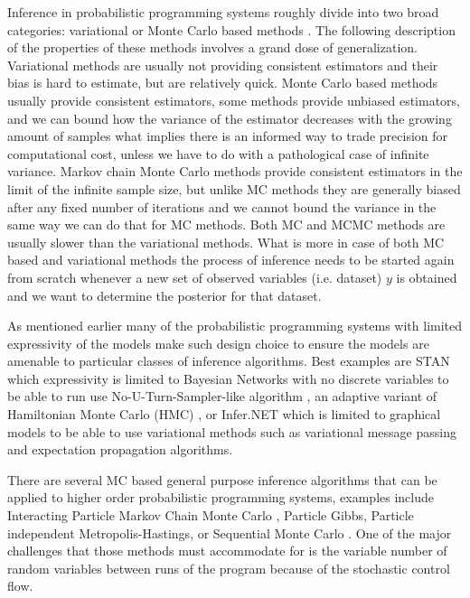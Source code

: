 \documentclass[12pt]{article}
\begin{document}
Inference in probabilistic programming systems roughly divide into two broad categories: variational \citep{WainwrightJordan2008} or Monte Carlo based methods \citep{mcbook}.
The following description of the properties of these methods involves a grand dose of generalization.
Variational methods are usually not providing consistent estimators and their bias is hard to estimate, but are relatively quick.
Monte Carlo based methods usually provide consistent estimators, some methods provide unbiased estimators, and we can bound how the variance of the estimator decreases with the growing amount of samples what implies there is an informed way to trade precision for computational cost, unless we have to do with a pathological case of infinite variance. 
Markov chain Monte Carlo methods provide consistent estimators in the limit of the infinite sample size, but unlike MC methods they are generally biased after any fixed number of iterations \citep{JacobEtAl2017} and we cannot bound the variance in the same way we can do that for MC methods.
Both MC and MCMC methods are usually slower than the variational methods.
What is more in case of both MC based and variational methods the process of inference needs to be started again from scratch whenever a new set of observed variables (i.e. dataset) $y$ is obtained and we want to determine the posterior for that dataset.  

As mentioned earlier many of the probabilistic programming systems with limited expressivity of the models make such design choice to ensure the models are amenable to particular classes of inference algorithms. 
Best examples are STAN which expressivity is limited to Bayesian Networks with no discrete variables to be able to run use No-U-Turn-Sampler-like algorithm \citep{NUTS}, an adaptive variant of Hamiltonian Monte Carlo (HMC) \citep{HMC}, or Infer.NET which is limited to graphical models to be able to use variational methods such as variational message passing \citep{variationalmessagepassing} and expectation propagation \citep{EP} algorithms.

There are several MC based general purpose inference algorithms that can be applied to higher order probabilistic programming systems, examples include Interacting Particle Markov Chain Monte Carlo \citep{rainforth2016interacting}, Particle Gibbs, Particle independent Metropolis-Hastings, or Sequential Monte Carlo \citep{WoodEtAl2014}.
One of the major challenges that those methods must accommodate for is the variable number of random variables between runs of the program because of the stochastic control flow.  
\end{document}

